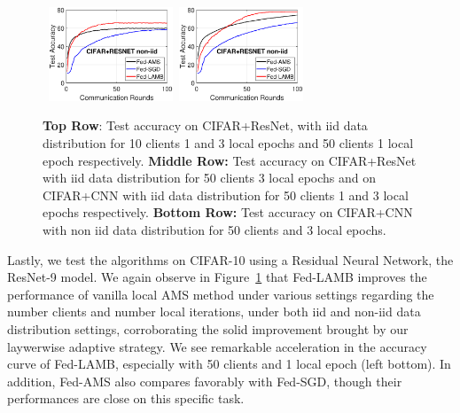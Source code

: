 \documentclass[11pt]{article}
\begin{document}
\begin{figure}[H]
\begin{center}
{        }
                        \mbox{
                 \includegraphics[width=0.33\textwidth]{figure/cifar_testerror_resnet_ep1_client50_iid0.eps}
        \includegraphics[width=0.33\textwidth]{figure/cifar_testerror_resnet_ep3_client50_iid0.eps}        
        }
    \end{center}
	\caption{\textbf{Top Row}: Test accuracy on CIFAR+ResNet, with iid data distribution for 10 clients 1 and 3 local epochs and 50 clients 1 local epoch respectively. 
	\textbf{Middle Row:} Test accuracy on CIFAR+ResNet with iid data distribution for 50 clients 3 local epochs and on CIFAR+CNN with iid data distribution for 50 clients 1 and 3 local epochs respectively.
	\textbf{Bottom Row:} Test accuracy on CIFAR+CNN with non iid data distribution for 50 clients and 3 local epochs.}
	\label{fig:cifar-cnn-iid}
\end{figure}
\vspace{-0.15in}


Lastly, we test the algorithms on CIFAR-10 using a Residual Neural Network, the ResNet-9 model. 
We again observe in Figure~\ref{fig:cifar-cnn-iid} that Fed-LAMB improves the performance of vanilla local AMS method under various settings regarding the number clients and number local iterations, under both iid and non-iid data distribution settings, corroborating the solid improvement brought by our laywerwise adaptive strategy. We see remarkable acceleration in the accuracy curve of Fed-LAMB, especially with 50 clients and 1 local epoch (left bottom). In addition, Fed-AMS also compares favorably with Fed-SGD, though their performances are close on this specific task. 
\end{document}
